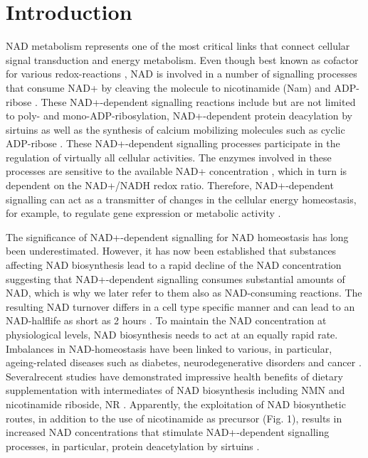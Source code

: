 
\section{Introduction}

NAD metabolism represents one of the most critical links that connect cellular signal transduction and energy metabolism. Even though best known as cofactor for various redox-reactions , NAD is involved in a number of signalling processes that consume NAD+ by cleaving the molecule to nicotinamide (Nam) and ADP-ribose \cite{Verdin2015}. These NAD+-dependent signalling reactions include but are not limited to poly- and mono-ADP-ribosylation, NAD+-dependent protein deacylation by sirtuins as well as the synthesis of calcium mobilizing molecules such as cyclic ADP-ribose \cite{Opitz2015}. These NAD+-dependent signalling processes participate in the regulation of virtually all cellular activities. The enzymes involved in these processes are sensitive to the available NAD+ concentration \cite{Ruggieri2015}, which in turn is dependent on the NAD+/NADH redox ratio. Therefore, NAD+-dependent signalling can act as a transmitter of changes in the cellular energy homeostasis, for example, to regulate gene expression or metabolic activity \cite{Koch-Nolte2009}.

The significance of NAD+-dependent signalling for NAD homeostasis has long been underestimated. However, it has now been established that substances affecting NAD biosynthesis lead to a rapid decline of the NAD concentration \cite{Vacor2018} suggesting that NAD+-dependent signalling consumes substantial amounts of NAD, which is why we later refer to them also as NAD-consuming reactions. The resulting NAD turnover differs in a cell type specific manner and can lead to an NAD-halflife as short as 2 hours \cite{Rabinowitz2018}. To maintain the NAD concentration at physiological levels, NAD biosynthesis needs to act at an equally rapid rate. Imbalances in NAD-homeostasis have been linked to various, in particular, ageing-related diseases such as diabetes, neurodegenerative disorders and cancer \cite{Chiarugi2012,Verdin2015}. Severalrecent studies have demonstrated impressive health benefits of dietary supplementation with intermediates of NAD biosynthesis including NMN and nicotinamide riboside, NR \cite{ImaiCellmetab2018}. Apparently, the exploitation of NAD biosynthetic routes, in addition to the use of nicotinamide as precursor (Fig. 1), results in increased NAD concentrations that stimulate NAD+-dependent signalling processes, in particular, protein deacetylation by sirtuins \cite{North2004}.

